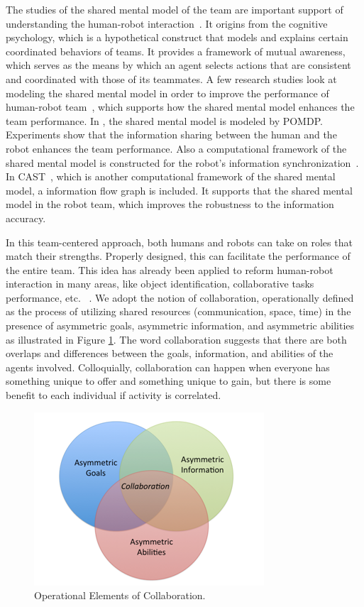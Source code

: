 \documentclass[phd]{byuprop}
\begin{document}
The studies of the shared mental model of the team are important support of understanding the human-robot interaction~\cite{FSS149109}.
It origins from the cognitive psychology, which is a hypothetical construct that models and explains certain coordinated behaviors of teams.
It provides a framework of mutual awareness, which serves as the means by which an agent selects actions that are consistent and coordinated with those of its teammates.
A few research studies look at modeling the shared mental model in order to improve the performance of human-robot team~\cite{nikolaidis2012human,Yen_implementingshared,FSS149109,Jonker:2010:SMM:2018118.2018128,Neerincx2011,Mathieu2000,Kennedy2007}, which supports how the shared mental model enhances the team performance.
In \cite{nikolaidis2012human}, the shared mental model is modeled by POMDP. 
Experiments show that the information sharing between the human and the robot enhances the team performance.
Also a computational framework of the shared mental model is constructed for the robot's information synchronization~\cite{FSS149109}.
In CAST~\cite{FSS149109}, which is another computational framework of the shared mental model, a information flow graph is included. 
It supports that the shared mental model in the robot team, which improves the robustness to the information accuracy.

In this team-centered approach, both humans and robots can take on roles that match their strengths. Properly designed, this can facilitate the performance of the entire team.
This idea has already been applied to reform human-robot interaction in many areas, like object identification, collaborative tasks performance, etc. ~\cite{Hoffman2004}. 
We adopt the notion of collaboration, operationally defined as the process of utilizing shared resources (communication, space, time) in the presence of asymmetric goals, asymmetric information, and asymmetric abilities as illustrated in Figure \ref{fig:collaboration}. 
The word collaboration suggests that there are both overlaps and differences between the goals, information, and abilities of the agents involved. Colloquially, collaboration can happen when everyone has something unique to offer and something unique to gain, but there is some benefit to each individual if activity is correlated.

\begin{figure}[hbtp]
\centering
\includegraphics[width=0.4\linewidth]{./fig/collaboration.png}
\caption{Operational Elements of Collaboration.}
\label{fig:collaboration}
\end{figure}
\end{document}
